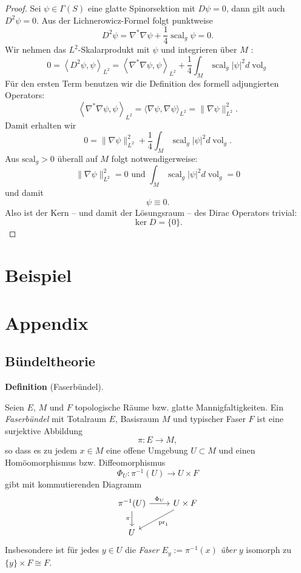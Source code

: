\documentclass[10pt, letterpaper]{article}
\newcommand{\CustomHeading}[3]{%
  \par\medskip\noindent%
  \textbf{#1 #2} \textnormal{(#3)}.\enskip%
}
\newenvironment{DEF}[2]{\CustomHeading{Definition}{#1}{#2}}{}
\begin{document}
\begin{proof}
Sei $\psi \in \Gamma(S)$ eine glatte Spinorsektion mit $D \psi=0$, dann gilt auch $D^2\psi=0$. Aus der Lichnerowicz-Formel folgt punktweise
$$
D^2 \psi=\nabla^* \nabla \psi+\frac{1}{4} \operatorname{scal}_g \psi =0.
$$
Wir nehmen das $L^2$-Skalarprodukt mit $\psi$ und integrieren über $M$ :
$$
0=\left\langle D^2 \psi, \psi\right\rangle_{L^2}=\left\langle\nabla^* \nabla \psi, \psi\right\rangle_{L^2}+\frac{1}{4} \int_M \operatorname{scal}_g|\psi|^2 d \operatorname{vol}_g
$$
Für den ersten Term benutzen wir die Definition des formell adjungierten Operators:
$$
\left\langle\nabla^* \nabla \psi, \psi\right\rangle_{L^2}=\langle\nabla \psi, \nabla \psi\rangle_{L^2}=\|\nabla \psi\|_{L^2}^2 .
$$
Damit erhalten wir
$$
0=\|\nabla \psi\|_{L^2}^2+\frac{1}{4} \int_M \operatorname{scal}_g|\psi|^2 d \operatorname{vol}_g .
$$
Aus $\text {scal}_g>0$ überall auf $M$ folgt notwendigerweise:
$$
\|\nabla \psi\|_{L^2}^2=0 \text { und } \int_M \operatorname{scal}_g|\psi|^2 d \operatorname{vol}_g=0
$$
und damit
$$
\psi \equiv 0 .
$$
Also ist der Kern – und damit der Lösungsraum – des Dirac Operators trivial:
\[
\ker D=\{0\}.
\]
\end{proof}

\pagebreak


\section{Beispiel}



\pagebreak


\section{Appendix}



\subsection{Bündeltheorie}

\begin{DEF}{}{Faserbündel}
Seien $E$, $M$ und $F$ topologische Räume bzw. glatte Mannigfaltigkeiten. Ein \emph{Faserbündel} mit Totalraum $E$, Basisraum $M$ und typischer Faser $F$
ist eine surjektive Abbildung
\[
\pi:E\to M,
\]
so dass es zu jedem $x\in M$ eine offene Umgebung $U\subset M$ und einen
Homöomorphismus bzw. Diffeomorphismus
\[
\Phi_U:\pi^{-1}(U)\to U\times F
\]
gibt mit kommutierenden Diagramm
\[
\begin{tikzcd}
\pi^{-1}(U) \arrow[r,"\Phi_U"] \arrow[d,"\pi"'] & U\times F \arrow[dl,"\operatorname{pr}_1"] \\
U &
\end{tikzcd}
\]
Insbesondere ist für jedes $y\in U$ die \emph{Faser} $E_y:=\pi^{-1}(x)$ \emph{über} $y$ isomorph zu $\{y\}\times F\cong F$.
\end{DEF}
\end{document}
